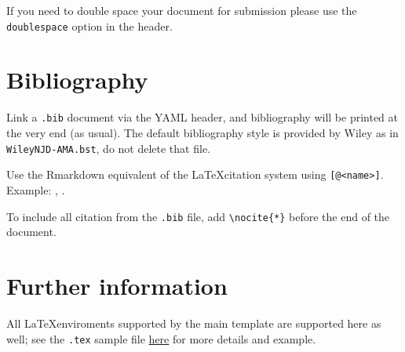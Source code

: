 \documentclass[AMA,STIX1COL,]{WileyNJD-v2}
\begin{document}
If you need to double space your document for submission please use the
\texttt{doublespace} option in the header.

\section{Bibliography}\label{bibliography}

Link a \texttt{.bib} document via the YAML header, and bibliography will
be printed at the very end (as usual). The default bibliography style is
provided by Wiley as in \texttt{WileyNJD-AMA.bst}, do not delete that
file.

Use the Rmarkdown equivalent of the \LaTeX citation system using
\texttt{{[}@\textless{}name\textgreater{}{]}}. Example:
\citep{Taylor1937}, \citep{Knupp1999, Kamm2000}.

To include all citation from the \texttt{.bib} file, add
\texttt{\textbackslash{}nocite\{*\}} before the end of the document.

\section{Further information}\label{further-information}

All \LaTeX enviroments supported by the main template are supported here
as well; see the \texttt{.tex} sample file
\href{http://onlinelibrary.wiley.com/journal/10.1002/(ISSN)1097-0258/homepage/la_tex_class_file.htm}{here}
for more details and example.


\end{document}

